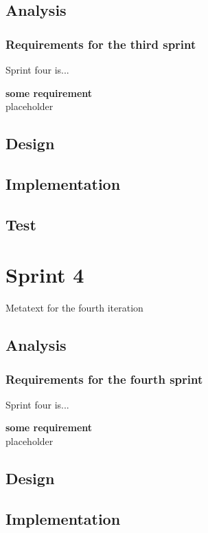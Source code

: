 \section{Analysis}

\subsection{Requirements for the third sprint}
Sprint four is...

\textbf{some requirement}\\
placeholder


\section{Design}

\section{Implementation}


\section{Test}



\chapter{Sprint 4}
Metatext for the fourth iteration
\section{Analysis}

\subsection{Requirements for the fourth sprint}
Sprint four is...

\textbf{some requirement}\\
placeholder


\section{Design}

\section{Implementation}


